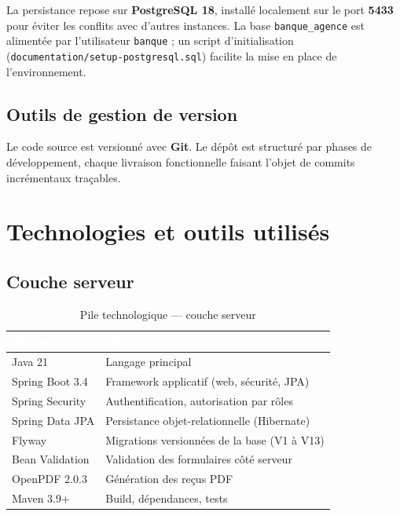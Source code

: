 \documentclass[11pt,a4paper,oneside]{report}
\newcommand{\tabhead}[1]{\textcolor{white}{\textbf{#1}}}
\begin{document}
La persistance repose sur \textbf{PostgreSQL 18}, installé localement sur le port \textbf{5433} pour éviter les conflits avec d'autres instances. La base \texttt{banque\_agence} est alimentée par l'utilisateur \texttt{banque} ; un script d'initialisation (\texttt{documentation/setup-postgresql.sql}) facilite la mise en place de l'environnement.

\subsection{Outils de gestion de version}

Le code source est versionné avec \textbf{Git}. Le dépôt est structuré par phases de développement, chaque livraison fonctionnelle faisant l'objet de commits incrémentaux traçables.

\section{Technologies et outils utilisés}

\subsection{Couche serveur}

\begin{table}[H]
    \centering
    \caption{Pile technologique — couche serveur}
    \label{tab:stack-backend}
    \begin{tabular}{@{}lp{9cm}@{}}
        \rowcolor{AmanaBrown}
        \tabhead{Technologie} & \tabhead{Rôle} \\
        \midrule
        Java 21 & Langage principal \\
        Spring Boot 3.4 & Framework applicatif (web, sécurité, JPA) \\
        Spring Security & Authentification, autorisation par rôles \\
        Spring Data JPA & Persistance objet-relationnelle (Hibernate) \\
        Flyway & Migrations versionnées de la base (V1 à V13) \\
        Bean Validation & Validation des formulaires côté serveur \\
        OpenPDF 2.0.3 & Génération des reçus PDF \\
        Maven 3.9+ & Build, dépendances, tests \\
        \bottomrule
    \end{tabular}
\end{table}
\end{document}
